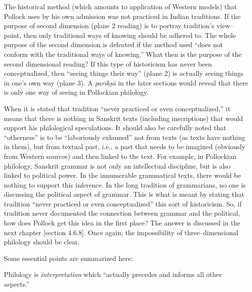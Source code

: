 The historical method (which amounts to application of Western models) that Pollock uses by his own admission was not practiced in Indian traditions. If the purpose of second dimension (plane 2 reading) is to portray tradition’s view–point, then only traditional ways of knowing should be adhered to. The whole purpose of the second dimension is defeated if the method used “does not conform with the traditional ways of knowing.” What then is the purpose of the second dimensional reading? If this type of historicism has never been conceptualized, then “seeing things their way” (plane 2) is actually seeing things in one’s own way (plane 3). A \textit{parīkṣā} in the later sections would reveal that there is only one way of seeing in Pollockian philology.

When it is stated that tradition “never practiced or even conceptualized,” it means that there is nothing in Sanskrit texts (including inscriptions) that would support his philological speculations. It should also be carefully noted that “otherness” is to be “laboriously exhumed” not from texts (as texts have nothing in them), but from textual past, i.e., a past that needs to be imagined (obviously from Western sources) and then linked to the text. For example, in Pollockian philology, Sanskrit grammar is not only an intellectual discipline, but is also linked to political power. In the innumerable grammatical texts, there would be nothing to support this inference. In the long tradition of grammarians, no one is discussing the political aspect of grammar. This is what is meant by stating that tradition “never practiced or even conceptualized” this sort of historicism. So, if tradition never documented the connection between grammar and the political, how does Pollock get this idea in the first place? The answer is discussed in the next chapter [section 4.6.8]. Once again, the impossibility of three–dimensional philology should be clear.

Some essential points are summarized here:

\item Philology is \textit{interpretation} which “actually precedes and informs all other aspects.”

